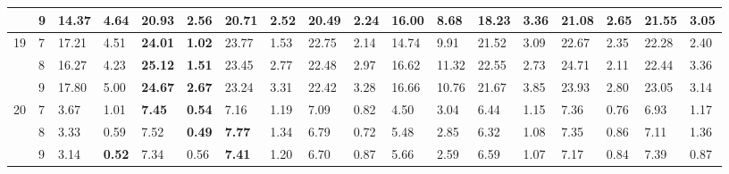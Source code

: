 \documentclass[conference]{IEEEtran}
\begin{document}
\begin{table}[]
\begin{tabular}{|cl|ll|ll|ll|ll|ll|ll|ll|ll|}
		\multicolumn{1}{|c|}{} & 9 & \multicolumn{1}{l|}{14.37} & 4.64 & \multicolumn{1}{l|}{20.93} & 2.56 & \multicolumn{1}{l|}{20.71} & 2.52 & \multicolumn{1}{l|}{20.49} & \textbf{2.24} & \multicolumn{1}{l|}{16.00} & 8.68 & \multicolumn{1}{l|}{18.23} & 3.36 & \multicolumn{1}{l|}{21.08} & 2.65 & \multicolumn{1}{l|}{\textbf{21.55}} & 3.05 \\ \hline
		\multicolumn{1}{|c|}{\multirow{3}{*}{19}} & 7 & \multicolumn{1}{l|}{17.21} & 4.51 & \multicolumn{1}{l|}{\textbf{24.01}} & \textbf{1.02} & \multicolumn{1}{l|}{23.77} & 1.53 & \multicolumn{1}{l|}{22.75} & 2.14 & \multicolumn{1}{l|}{14.74} & 9.91 & \multicolumn{1}{l|}{21.52} & 3.09 & \multicolumn{1}{l|}{22.67} & 2.35 & \multicolumn{1}{l|}{22.28} & 2.40 \\ \cline{2-18} 
		\multicolumn{1}{|c|}{} & 8 & \multicolumn{1}{l|}{16.27} & 4.23 & \multicolumn{1}{l|}{\textbf{25.12}} & \textbf{1.51} & \multicolumn{1}{l|}{23.45} & 2.77 & \multicolumn{1}{l|}{22.48} & 2.97 & \multicolumn{1}{l|}{16.62} & 11.32 & \multicolumn{1}{l|}{22.55} & 2.73 & \multicolumn{1}{l|}{24.71} & 2.11 & \multicolumn{1}{l|}{22.44} & 3.36 \\ \cline{2-18} 
		\multicolumn{1}{|c|}{} & 9 & \multicolumn{1}{l|}{17.80} & 5.00 & \multicolumn{1}{l|}{\textbf{24.67}} & \textbf{2.67} & \multicolumn{1}{l|}{23.24} & 3.31 & \multicolumn{1}{l|}{22.42} & 3.28 & \multicolumn{1}{l|}{16.66} & 10.76 & \multicolumn{1}{l|}{21.67} & 3.85 & \multicolumn{1}{l|}{23.93} & 2.80 & \multicolumn{1}{l|}{23.05} & 3.14 \\ \hline
		\multicolumn{1}{|c|}{\multirow{3}{*}{20}} & 7 & \multicolumn{1}{l|}{3.67} & 1.01 & \multicolumn{1}{l|}{\textbf{7.45}} & \textbf{0.54} & \multicolumn{1}{l|}{7.16} & 1.19 & \multicolumn{1}{l|}{7.09} & 0.82 & \multicolumn{1}{l|}{4.50} & 3.04 & \multicolumn{1}{l|}{6.44} & 1.15 & \multicolumn{1}{l|}{7.36} & 0.76 & \multicolumn{1}{l|}{6.93} & 1.17 \\ \cline{2-18} 
		\multicolumn{1}{|c|}{} & 8 & \multicolumn{1}{l|}{3.33} & 0.59 & \multicolumn{1}{l|}{7.52} & \textbf{0.49} & \multicolumn{1}{l|}{\textbf{7.77}} & 1.34 & \multicolumn{1}{l|}{6.79} & 0.72 & \multicolumn{1}{l|}{5.48} & 2.85 & \multicolumn{1}{l|}{6.32} & 1.08 & \multicolumn{1}{l|}{7.35} & 0.86 & \multicolumn{1}{l|}{7.11} & 1.36 \\ \cline{2-18} 
		\multicolumn{1}{|c|}{} & 9 & \multicolumn{1}{l|}{3.14} & \textbf{0.52} & \multicolumn{1}{l|}{7.34} & 0.56 & \multicolumn{1}{l|}{\textbf{7.41}} & 1.20 & \multicolumn{1}{l|}{6.70} & 0.87 & \multicolumn{1}{l|}{5.66} & 2.59 & \multicolumn{1}{l|}{6.59} & 1.07 & \multicolumn{1}{l|}{7.17} & 0.84 & \multicolumn{1}{l|}{7.39} & 0.87 \\ \hline
	\end{tabular}
\end{table}
\end{document}
